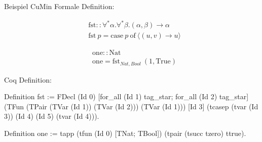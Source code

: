 \documentclass{beamer}
\begin{document}
\begin{frame}[fragile]{Beispiel CuMin}
	Formale Definition:\\
	\begin{minipage}{.45 \linewidth}
		\begin{align*}
		&\text{fst}::\forall^{*}\alpha.\forall^{*}\beta.(\alpha, \beta) \rightarrow\alpha\\
		&\text{fst}\: p = \text{case}\: p\: \text{of}\: \langle(u,v) \rightarrow u\rangle
		\end{align*}
	\end{minipage}
	\begin{minipage}{.45 \linewidth}
		\begin{align*}
		&\text{one} :: \text{Nat}\\
		&\text{one} = \text{fst}_{Nat, Bool} ~ (1, \text{True})
		\end{align*}
	\end{minipage}
	\vspace*{1em}
	
	Coq Definition:
	\begin{coqcode}
  Definition fst := FDecl (Id 0)
    [for_all (Id 1) tag_star; for_all (Id 2) tag_star] 
    (TFun (TPair (TVar (Id 1)) (TVar (Id 2))) (TVar (Id 1)))
    [Id 3]
    (tcasep (tvar (Id 3)) (Id 4) (Id 5) (tvar (Id 4))).
		
  Definition one := tapp (tfun (Id 0) [TNat; TBool])
    (tpair (tsucc tzero) ttrue).
	\end{coqcode}
\end{frame}
\end{document}
